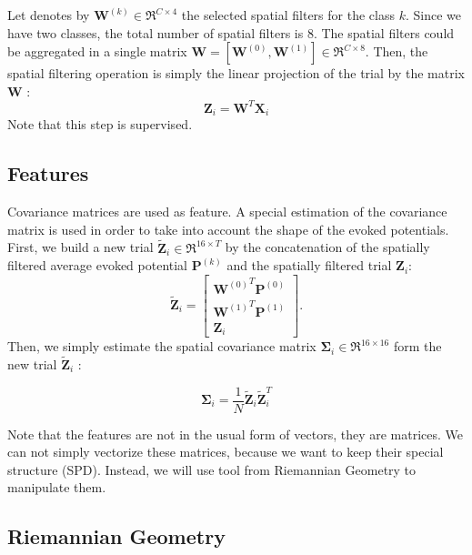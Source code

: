\documentclass[11pt,a4paper]{article}
\begin{document}
Let denotes by $\mathbf{W}^{(k)} \in \Re^{C \times 4 }$ the selected spatial filters for the class $k$. Since we have two classes, the total number of spatial filters is 8. The spatial filters could be aggregated in a single matrix $\mathbf{W} = [ \mathbf{W}^{(0)} , \mathbf{W}^{(1)} ] \in \Re^{C \times 8}$. Then, the spatial filtering operation is simply the linear projection of the trial by the matrix $\mathbf{W}$ : 
\begin{equation}
\mathbf{Z}_i = \mathbf{W}^T \mathbf{X}_i
\end{equation}
Note that this step is supervised.
\subsection{Features}
Covariance matrices are used as feature. A special estimation of the covariance matrix is used in order to take into account the shape of the evoked potentials. First, we build a new trial $\tilde{\mathbf{Z}}_i \in \Re^{16 \times T}$ by the concatenation of the spatially filtered average evoked potential $\mathbf{P}^{(k)}$ and the spatially filtered trial $\mathbf{Z}_i$: 
\begin{equation}
\tilde{\mathbf{Z}}_i =  \left[ 
\begin{array}{c}
{\mathbf{W}^{(0)}}^T \mathbf{P}^{(0)}\\ 
{\mathbf{W}^{(1)}}^T \mathbf{P}^{(1)} \\
\mathbf{Z}_i
\end{array} \right].
\end{equation}
Then, we simply estimate the spatial covariance matrix $\mathbf{\Sigma}_i \in \Re^{16 \times 16}$ form the new trial $\tilde{\mathbf{Z}}_i$ : 

\begin{equation}
\mathbf{\Sigma}_i  = \frac{1}{N} \tilde{\mathbf{Z}}_i \tilde{\mathbf{Z}}_i^T
\end{equation}

Note that the features are not in the usual form of vectors, they are matrices. We can not simply vectorize these matrices, because we want to keep their special structure (SPD). Instead, we will use tool from Riemannian Geometry to manipulate them.

\subsection{Riemannian Geometry}
\end{document}
